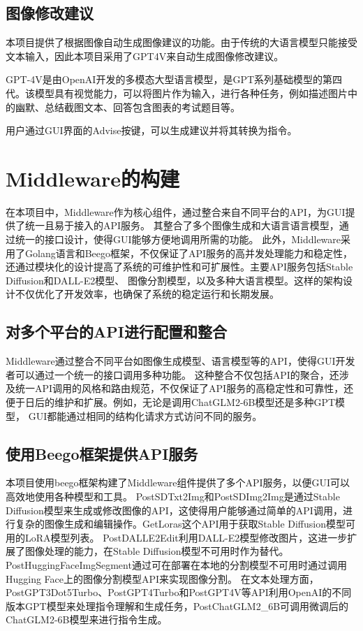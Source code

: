 \documentclass[a4paper,AutoFakeBold,oneside,12pt]{book}
\begin{document}
\subsection{图像修改建议}
本项目提供了根据图像自动生成图像建议的功能。由于传统的大语言模型只能接受文本输入，因此本项目采用了GPT4V来自动生成图像修改建议。

GPT-4V是由OpenAI开发的多模态大型语言模型，是GPT系列基础模型的第四代。该模型具有视觉能力，可以将图片作为输入，进行各种任务，例如描述图片中的幽默、总结截图文本、回答包含图表的考试题目等。

用户通过GUI界面的Advise按键，可以生成建议并将其转换为指令。

\section{Middleware的构建} %
在本项目中，Middleware作为核心组件，通过整合来自不同平台的API，为GUI提供了统一且易于接入的API服务。
其整合了多个图像生成和大语言语言模型，通过统一的接口设计，使得GUI能够方便地调用所需的功能。
此外，Middleware采用了Golang语言和Beego框架，不仅保证了API服务的高并发处理能力和稳定性，
还通过模块化的设计提高了系统的可维护性和可扩展性。主要API服务包括Stable Diffusion和DALL-E2模型、
图像分割模型，以及多种大语言模型。这样的架构设计不仅优化了开发效率，也确保了系统的稳定运行和长期发展。
\subsection{对多个平台的API进行配置和整合}
Middleware通过整合不同平台如图像生成模型、语言模型等的API，使得GUI开发者可以通过一个统一的接口调用多种功能。
这种整合不仅包括API的聚合，还涉及统一API调用的风格和路由规范，不仅保证了API服务的高稳定性和可靠性，还便于日后的维护和扩展。例如，无论是调用ChatGLM2-6B模型还是多种GPT模型，
GUI都能通过相同的结构化请求方式访问不同的服务。


\subsection{使用Beego框架提供API服务}
本项目使用beego框架构建了Middleware组件提供了多个API服务，以便GUI可以高效地使用各种模型和工具。
PostSDTxt2Img和PostSDImg2Img是通过Stable Diffusion模型来生成或修改图像的API，这使得用户能够通过简单的API调用，进行复杂的图像生成和编辑操作。GetLoras这个API用于获取Stable Diffusion模型可用的LoRA模型列表。
PostDALLE2Edit利用DALL-E2模型修改图片，这进一步扩展了图像处理的能力，在Stable Diffusion模型不可用时作为替代。
PostHuggingFaceImgSegment通过可在部署在本地的分割模型不可用时通过调用Hugging Face上的图像分割模型API来实现图像分割。
在文本处理方面，PostGPT3Dot5Turbo、PostGPT4Turbo和PostGPT4V等API利用OpenAI的不同版本GPT模型来处理指令理解和生成任务，PostChatGLM2\_6B可调用微调后的ChatGLM2-6B模型来进行指令生成。
\end{document}
